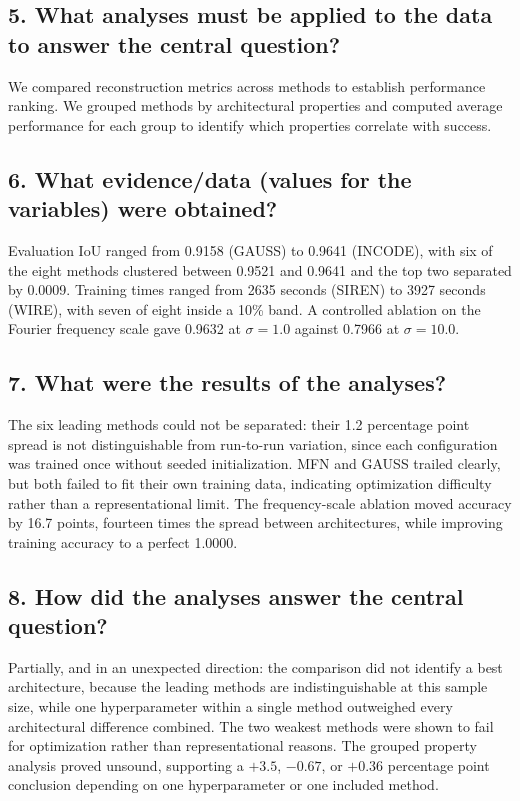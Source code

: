 \subsection*{5. What analyses must be applied to the data to answer the central question?}
We compared reconstruction metrics across methods to establish performance ranking. We grouped methods by architectural properties and computed average performance for each group to identify which properties correlate with success.

\subsection*{6. What evidence/data (values for the variables) were obtained?}
Evaluation IoU ranged from 0.9158 (GAUSS) to 0.9641 (INCODE), with six of the eight methods clustered between 0.9521 and 0.9641 and the top two separated by 0.0009. Training times ranged from 2635 seconds (SIREN) to 3927 seconds (WIRE), with seven of eight inside a 10\% band. A controlled ablation on the Fourier frequency scale gave 0.9632 at $\sigma = 1.0$ against 0.7966 at $\sigma = 10.0$.

\subsection*{7. What were the results of the analyses?}
The six leading methods could not be separated: their 1.2 percentage point spread is not distinguishable from run-to-run variation, since each configuration was trained once without seeded initialization. MFN and GAUSS trailed clearly, but both failed to fit their own training data, indicating optimization difficulty rather than a representational limit. The frequency-scale ablation moved accuracy by 16.7 points, fourteen times the spread between architectures, while improving training accuracy to a perfect 1.0000.

\subsection*{8. How did the analyses answer the central question?}
Partially, and in an unexpected direction: the comparison did not identify a best architecture, because the leading methods are indistinguishable at this sample size, while one hyperparameter within a single method outweighed every architectural difference combined. The two weakest methods were shown to fail for optimization rather than representational reasons. The grouped property analysis proved unsound, supporting a $+3.5$, $-0.67$, or $+0.36$ percentage point conclusion depending on one hyperparameter or one included method.

